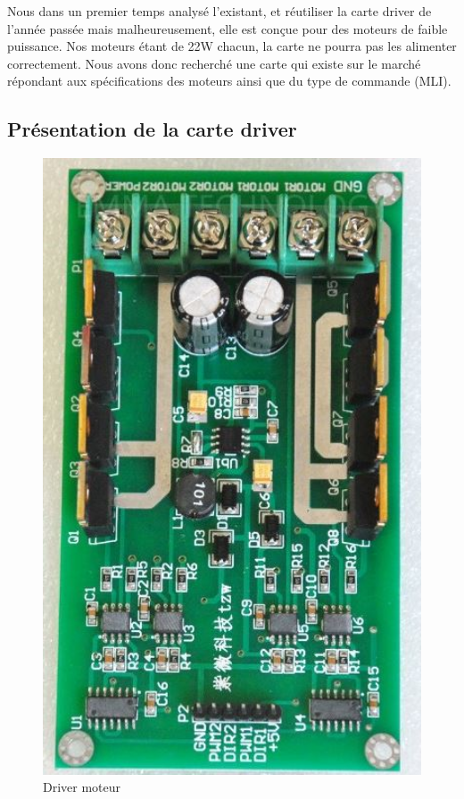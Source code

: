 Nous dans un premier temps analysé l'existant, et réutiliser la carte driver de l’année passée mais malheureusement, elle est conçue pour des moteurs de faible puissance. Nos moteurs étant de 22W chacun, la carte ne pourra pas les alimenter correctement. Nous avons donc recherché une carte qui existe sur le marché répondant aux spécifications des moteurs ainsi que du type de commande (MLI).

\subsection{Présentation de la carte driver}\label{presentation}

\begin{figure}[!ht]
	\centering
		\includegraphics[angle=270,width=15cm]{driver1.JPG}
	\caption{Driver moteur}
	\label{fig:driver1}
\end{figure}

